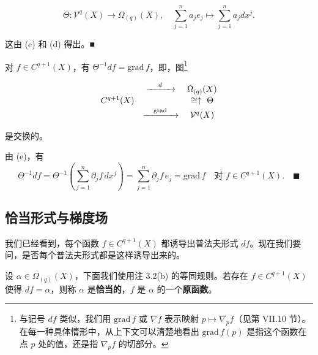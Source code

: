 \begin{remark}
\begin{items}
\[
\Theta : \mathcal{V}^{q}(X) \to \Omega_{(q)}(X) , \quad \sum_{j=1}^{n}a_{j}e_{j} \mapsto \sum_{j=1}^{n}a_{j}dx^{j} .
\]

\proofhead
这由 (c) 和 (d) 得出。\nobreak\hspace{0.35em}■
\item

对 $ f \in C^{q+1}(X) $，有 $ \Theta^{-1}df = \mathrm{grad}\,f $，即，图\footnote{与记号 $ df $ 类似，我们用 $ \mathrm{grad}\,f $ 或 $ \nabla f $ 表示映射 $ p \mapsto \nabla_{p}f $（见第 VII.10 节）。在每一种具体情形中，从上下文可以清楚地看出 $ \mathrm{grad}\,f(p) $ 是指这个函数在点 $ p $ 处的值，还是指 $ \nabla_{p}f $ 的切部分。}

\begin{equation*}
\begin{array}{ccc} & \xrightarrow{\hspace{1.2em} d \hspace{1.2em}} & \Omega_{(q)}(X) \\[0.3ex] C^{q+1}(X) & & \cong\uparrow\ \Theta \\[0.3ex] & \xrightarrow{\hspace{1em}\mathrm{grad}\hspace{1em}} & \mathcal{V}^{q}(X) \end{array}
\end{equation*}

是交换的。

\proofhead
由 (e)，有
\[
\Theta^{-1}df = \Theta^{-1}\left(\sum_{j=1}^{n}\partial_{j}f\,dx^{j}\right) = \sum_{j=1}^{n}\partial_{j}f\,e_{j} = \mathrm{grad}\,f \quad \text{对 } f \in C^{q+1}(X) .\quad\blacksquare
\]
\end{items}

\end{remark}

\subsection*{恰当形式与梯度场}

我们已经看到，每个函数 $ f \in C^{q+1}(X) $ 都诱导出普法夫形式 $ df $。现在我们要问，是否每个普法夫形式都是这样诱导出来的。

设 $ \alpha \in \Omega_{(q)}(X) $，下面我们使用注 3.2(b) 的等同规则。若存在 $ f \in C^{q+1}(X) $ 使得 $ df = \alpha $，则称 $ \alpha $ 是\textbf{恰当的}，$ f $ 是 $ \alpha $ 的一个\textbf{原函数}。

